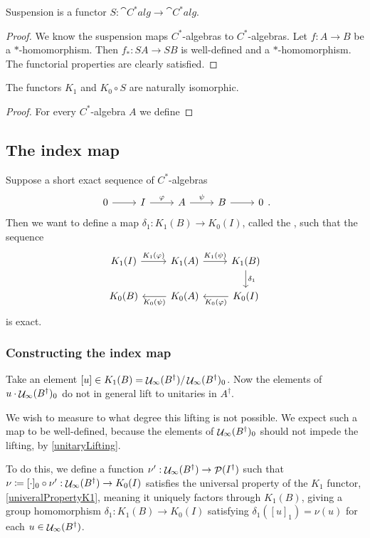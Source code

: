 \begin{lemma}
Suspension is a functor $S: \cat{C^*alg} \to \cat{C^*alg}$.
\end{lemma}
\begin{proof}
We know the suspension maps $C^*$-algebras to $C^*$-algebras. Let $f: A\to B$ be a $*$-homomorphism. Then $f_*: SA \to SB$ is well-defined and a $*$-homomorphism. The functorial properties are clearly satisfied.
\end{proof}

\begin{theorem}
The functors $K_1$ and $K_0\circ S$ are naturally isomorphic.
\end{theorem}
\begin{proof}
For every $C^*$-algebra $A$ we define
\end{proof}


\subsection{The index map}
Suppose a short exact sequence of $C^*$-algebras
\[  \begin{tikzcd}
0 \rar & I \rar{\varphi} & A \rar{\psi} & B\rar & 0
\end{tikzcd}.\]
Then we want to define a map $\delta_1:  K_1(B)\to K_0(I)$, called the , such that the sequence
\[ \begin{tikzcd}
K_1(I) \rar{K_1(\varphi)} & K_1(A) \rar{K_1(\psi)} & K_1(B) \dar{\delta_1} \\
K_0(B) & K_0(A) \lar{K_0(\psi)} & K_0(I) \lar{K_0(\varphi)}
\end{tikzcd} \]
is exact.

\subsubsection{Constructing the index map}
Take an element $[u]\in K_1(B) = \mathop{\mathcal{U}}\nolimits_\infty(B^\dagger) / \mathop{\mathcal{U}}\nolimits_\infty(B^\dagger)_0$. Now the elements of $u\cdot \mathop{\mathcal{U}}\nolimits_\infty(B^\dagger)_0$ do not in general lift to unitaries in $A^\dagger$.

We wish to measure to what degree this lifting is not possible. We expect such a map to be well-defined, because the elements of $\mathop{\mathcal{U}}\nolimits_\infty(B^\dagger)_0$ should not impede the lifting, by \ref{unitaryLifting}.



To do this, we define a function $\nu': \mathop{\mathcal{U}}\nolimits_\infty(B^\dagger)\to \mathop{\mathcal{P}}\nolimits(I^\dagger)$ such that $\nu \coloneqq [\cdot]_0\circ \nu': \mathop{\mathcal{U}}\nolimits_\infty(B^\dagger)\to K_0(I)$ satisfies the universal property of the $K_1$ functor, \ref{univeralPropertyK1}, meaning it uniquely factors through $K_1(B)$, giving a group homomorphism $\delta_1: K_1(B)\to K_0(I)$ satisfying $\delta_1([u]_1) = \nu(u)$ for each $u\in\mathop{\mathcal{U}}\nolimits_\infty(B^\dagger)$.


